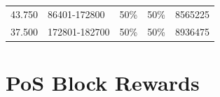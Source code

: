 \documentclass[11pt,a4paperpaper,]{report}
\begin{document}
\begin{longtable}[]{@{}lllll@{}}
\begin{minipage}[t]{0.16\columnwidth}
43.750\strut
\end{minipage} & \begin{minipage}[t]{0.19\columnwidth}\raggedright\strut
86401-172800\strut
\end{minipage} & \begin{minipage}[t]{0.10\columnwidth}\raggedright\strut
50\%\strut
\end{minipage} & \begin{minipage}[t]{0.10\columnwidth}\raggedright\strut
50\%\strut
\end{minipage} & \begin{minipage}[t]{0.16\columnwidth}\raggedright\strut
8565225\strut
\end{minipage}\tabularnewline
\begin{minipage}[t]{0.16\columnwidth}\raggedright\strut
37.500\strut
\end{minipage} & \begin{minipage}[t]{0.19\columnwidth}\raggedright\strut
172801-182700\strut
\end{minipage} & \begin{minipage}[t]{0.10\columnwidth}\raggedright\strut
50\%\strut
\end{minipage} & \begin{minipage}[t]{0.10\columnwidth}\raggedright\strut
50\%\strut
\end{minipage} & \begin{minipage}[t]{0.16\columnwidth}\raggedright\strut
8936475\strut
\end{minipage}\tabularnewline
\bottomrule
\end{longtable}

\newpage

\section{PoS Block Rewards}\label{pos-block-rewards}
\end{document}
